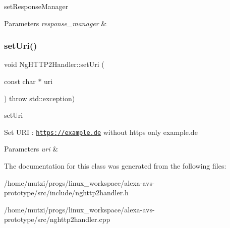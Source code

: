 set\+Response\+Manager 


\begin{DoxyParams}{Parameters}
{\em response\+\_\+manager} & \\
\hline
\end{DoxyParams}
\mbox{\label{classNetwork_1_1HTTP2_1_1NgHTTP2Handler_a2384e4c12557cd181915dd33775b8a1a}} 
\subsubsection{\texorpdfstring{set\+Uri()}{setUri()}}
{\footnotesize\ttfamily void Ng\+H\+T\+T\+P2\+Handler\+::set\+Uri (\begin{DoxyParamCaption}\item[{const char $\ast$}]{uri }\end{DoxyParamCaption}) throw  std\+::exception) }



set\+Uri 

Set U\+RI \+: \href{https://example.de}{\tt https\+://example.\+de} without https only example.\+de 
\begin{DoxyParams}{Parameters}
{\em uri} & \\
\hline
\end{DoxyParams}


The documentation for this class was generated from the following files\+:\begin{DoxyCompactItemize}
\item 
/home/mutzi/progs/linux\+\_\+workspace/alexa-\/avs-\/prototype/src/include/nghttp2handler.\+h\item 
/home/mutzi/progs/linux\+\_\+workspace/alexa-\/avs-\/prototype/src/nghttp2handler.\+cpp\end{DoxyCompactItemize}
